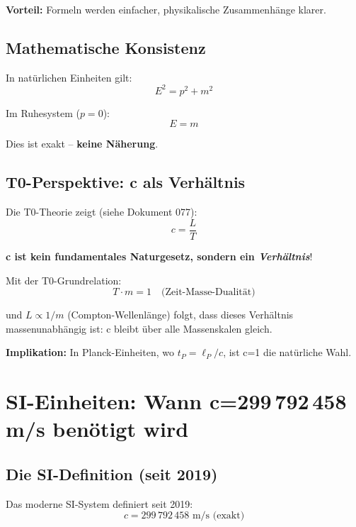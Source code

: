 	\textbf{Vorteil:} Formeln werden einfacher, physikalische Zusammenhänge klarer.
	
	\subsection{Mathematische Konsistenz}
	
	In natürlichen Einheiten gilt:
	\begin{equation}
		E^2 = p^2 + m^2
	\end{equation}
	
	Im Ruhesystem ($p=0$):
	\begin{equation}
		E = m
	\end{equation}
	
	Dies ist exakt -- \textbf{keine Näherung}.
	
	\subsection{T0-Perspektive: c als Verhältnis}
	
	Die T0-Theorie zeigt (siehe Dokument 077):
	\begin{equation}
		c = \frac{L}{T}
	\end{equation}
	
	\textbf{c ist kein fundamentales Naturgesetz, sondern ein \emph{Verhältnis}}!
	
	Mit der T0-Grundrelation:
	\begin{equation}
		T \cdot m = 1 \quad \text{(Zeit-Masse-Dualität)}
	\end{equation}
	
	und $L \propto 1/m$ (Compton-Wellenlänge) folgt, dass dieses Verhältnis massenunabhängig ist: c bleibt über alle Massenskalen gleich.
	
	\textbf{Implikation:} In Planck-Einheiten, wo $t_P = \ell_P/c$, ist c=1 die natürliche Wahl.
	
	\section{SI-Einheiten: Wann c=299\,792\,458 m/s benötigt wird}
	
	\subsection{Die SI-Definition (seit 2019)}
	
	Das moderne SI-System definiert seit 2019:
	\begin{equation}
		\boxed{c = 299\,792\,458 \text{ m/s} \text{ (exakt)}}
	\end{equation}
	
